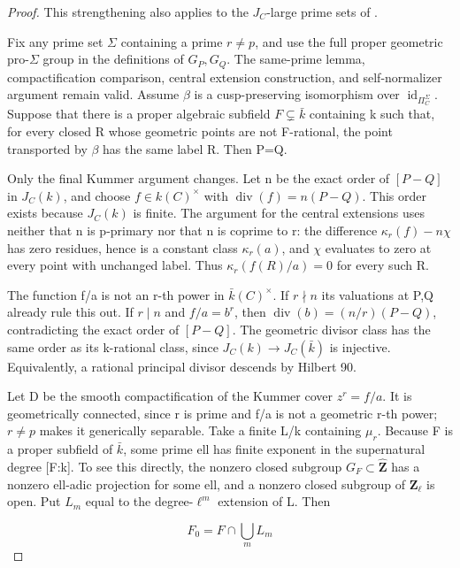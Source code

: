 \begin{proof}

This strengthening also applies to the \(J_C\)-large prime sets of \cite{ST2017}.

Fix any prime set \({\Sigma}\) containing a prime \(r\ne p\), and use the full proper geometric pro-\({\Sigma}\) group in the definitions of \(G_P,G_Q\). The same-prime lemma, compactification comparison, central extension construction, and self-normalizer argument remain valid. Assume \({\beta}\) is a cusp-preserving isomorphism over \(\operatorname{id}_{{\Pi}_C^{\Sigma}}\). Suppose that there is a proper algebraic subfield \(F{\subsetneq}\bar k\) containing k such that, for every closed R whose geometric points are not F-rational, the point transported by \({\beta}\) has the same label R. Then P=Q.

Only the final Kummer argument changes. Let n be the exact order of \([P-Q]\) in \(J_C(k)\), and choose \(f{\in}k(C)^{\times}\) with \(\operatorname{div}(f)=n(P-Q)\). This order exists because \(J_C(k)\) is finite. The argument for the central extensions uses neither that n is p-primary nor that n is coprime to r: the difference \({\kappa}_r(f)-n{\chi}\) has zero residues, hence is a constant class \({\kappa}_r(a)\), and \({\chi}\) evaluates to zero at every point with unchanged label. Thus \({\kappa}_r(f(R)/a)=0\) for every such R.

The function f/a is not an r-th power in \(\bar k(C)^{\times}\). If \(r\nmid n\) its valuations at P,Q already rule this out. If \(r\mid n\) and \(f/a=b^r\), then \(\operatorname{div}(b)=(n/r)(P-Q)\), contradicting the exact order of \([P-Q]\). The geometric divisor class has the same order as its k-rational class, since \(J_C(k){\to}J_C(\bar k)\) is injective. Equivalently, a rational principal divisor descends by Hilbert 90.

Let D be the smooth compactification of the Kummer cover \(z^r=f/a\). It is geometrically connected, since r is prime and f/a is not a geometric r-th power; \(r{\ne}p\) makes it generically separable. Take a finite L/k containing \({\mu}_r\). Because F is a proper subfield of \(\bar k\), some prime ell has finite exponent in the supernatural degree {[}F:k{]}. To see this directly, the nonzero closed subgroup \(G_F{\subset}\widehat{\mathbf Z}\) has a nonzero ell-adic projection for some ell, and a nonzero closed subgroup of \(\mathbf{Z}_\ell\) is open. Put \(L_m\) equal to the degree-\(\ell^m\) extension of L. Then

\[F_0=F\cap\bigcup_m L_m\]


\end{proof}
